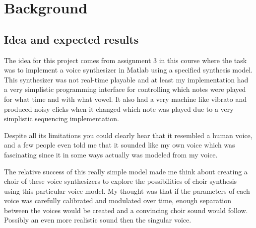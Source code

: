 \documentclass{article}
\title{\papertitle}
\newcommand{\fo}{$f_0$}
\begin{document}
%
\capstartfalse
\maketitle
\capstarttrue
%
\begin{abstract}
The source-filter model for voice synthesis is an effective way of generating a somewhat realistic voice and can be extended with for example \fo  modulation to make it even better. By combining multiple of these source-filter models and modifying the parameters for each voice a model for choir synthesis is created. This model is in this project implemented in the language Pure Data and made real-time playable. It is found to be a model that generate a sound that resembles a choir. Although it has some problems, for example a beating is heard when multiple voices sing in unison.
\end{abstract}
\section{Background}\label{sec:introduction}

\subsection{Idea and expected results}
The idea for this project comes from assignment 3 in this course where the task was to implement a voice synthesizer in Matlab using a specified synthesis model. This synthesizer was not real-time playable and at least my implementation had a very simplistic programming interface for controlling which notes were played for what time and with what vowel. It also had a very machine like vibrato and produced noisy clicks when it changed which note was played due to a very simplistic sequencing implementation.

Despite all its limitations you could clearly hear that it resembled a human voice, and a few people even told me that it sounded like my own voice which was fascinating since it in some ways actually was modeled from my voice.

The relative success of this really simple model made me think about creating a choir of these voice synthesizers to explore the possibilities of choir synthesis using this particular voice model. My thought was that if the parameters of each voice was carefully calibrated and modulated over time, enough separation between the voices would be created and a convincing choir sound would follow. Possibly an even more realistic sound then the singular voice.
\end{document}

